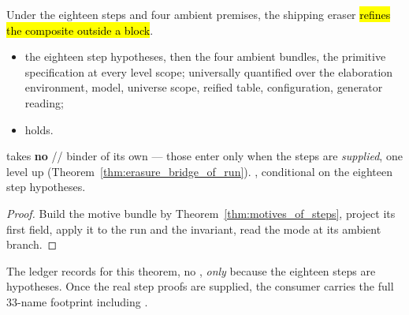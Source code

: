 \begin{theorem}
\label{thm:visitExpr_refines_erasesLB}
\leanok
{}
 Under the eighteen steps and four ambient premises, the shipping eraser \hl{refines the
composite outside a block}.
\begin{itemize}
\item {} the eighteen step hypotheses, then the four ambient bundles, the primitive
specification at every level scope; universally quantified over the elaboration environment, model, universe scope, reified table, configuration, generator reading;
\item {}  holds.
\end{itemize}
 takes \textbf{no} // binder of its own
--- those enter only when the steps are \emph{supplied}, one level up
(Theorem~\ref{thm:erasure_bridge_of_run}).
 \stProved{}, conditional on the eighteen step hypotheses.
\end{theorem}
\begin{proof}
\leanok
{}
 Build the motive bundle by Theorem~\ref{thm:motives_of_steps}, project its first field, apply
it to the run and the invariant, read the mode at its ambient branch.
\end{proof}

\begin{remark}
 The ledger records  for this theorem, no
, \emph{only} because the eighteen steps are hypotheses. Once the real step proofs are
supplied, the consumer  carries the full $33$-name footprint
including .
\end{remark}

